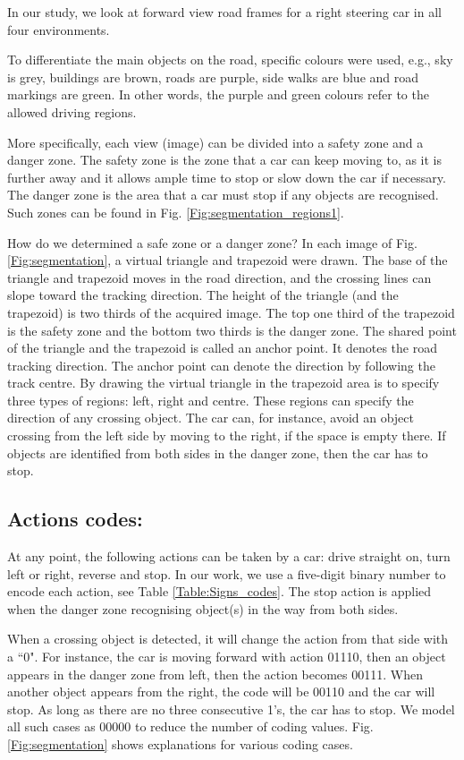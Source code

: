 \documentclass[a4paper,twoside]{article}
\begin{document}
In our study, we look at forward view road frames for a right steering car in all four environments. 

To differentiate the main objects on the road, specific colours were used, e.g., sky is grey, buildings are brown, roads are purple, side walks are blue and road markings are green. In other words, the purple and green colours refer to the allowed driving regions.  

More specifically, each view (image) can be divided into a safety zone and a danger zone. The safety zone is the zone that a car can keep moving to, as it is further away and it allows ample time to stop or slow down the car if necessary. The danger zone is the area that a car must stop if any objects are recognised. Such zones can be found in Fig. \ref{Fig:segmentation_regions1}. 

How do we determined a safe zone or a danger zone? In each image of Fig. \ref{Fig:segmentation}, a virtual triangle and trapezoid were drawn. The base of the triangle and trapezoid moves in the road direction, and the crossing lines can slope toward the tracking direction. The height of the triangle (and the trapezoid) is two thirds of the acquired image. The top one third of the trapezoid is the safety zone and the bottom two thirds is the danger zone. The shared point of the triangle and the trapezoid is called an anchor point. It denotes the road tracking direction. The anchor point can denote the direction by following the track centre. By drawing the virtual triangle in the trapezoid area is to specify three types of regions: left, right and centre. These regions can specify the direction of any crossing object. The car can, for instance, avoid an object crossing from the left side by moving to the right, if the space is empty there. If objects are identified from both sides in the danger zone, then the car has to stop.  

\subsection{Actions codes:} 
At any point, the following actions can be taken by a car: drive straight on, turn left or right, reverse and stop. In our work, we use a five-digit binary number to encode each action, see Table \ref{Table:Signs_codes}. The stop action is applied when the danger zone recognising object(s) in the way from both sides. 

When a crossing object is detected, it will change the action from that side with a ``0". For instance, the car is moving forward with action 01110, then an object appears in the danger zone from left, then the action becomes 00111. When another object appears from the right, the code will be 00110 and the car will stop. As long as there are no three consecutive 1's, the car has to stop.  We model all such cases as 00000 to reduce the number of coding values. Fig. \ref{Fig:segmentation} shows explanations for various coding cases.
\end{document}
